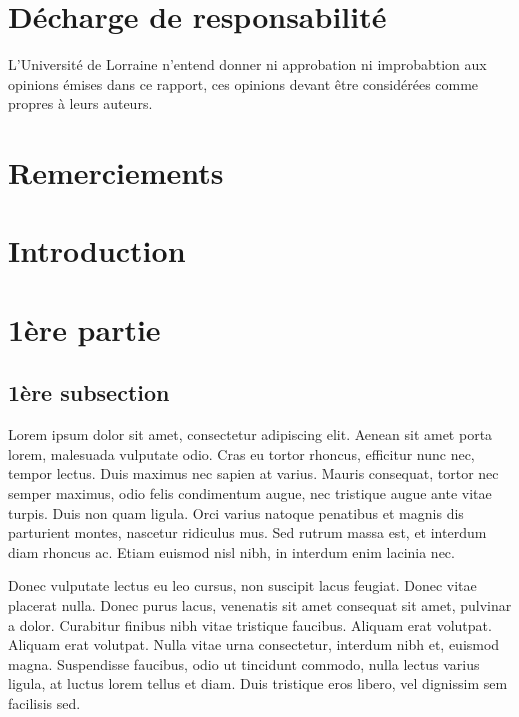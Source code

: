 \documentclass[11pt]{article}
\begin{document}
\newpage \newpage
\section*{Décharge de responsabilité }\bigbreak
L'Université de Lorraine n'entend donner ni approbation  ni improbabtion aux opinions émises dans ce rapport,
ces opinions devant être considérées comme propres à leurs auteurs. \bigbreak

\newpage
\section*{Remerciements}


\newpage
\tableofcontents
\newpage

\setcounter{page}{1}
\section*{Introduction}



\section{1ère partie}
\subsection{1ère subsection}
Lorem ipsum dolor sit amet, consectetur adipiscing elit. Aenean sit amet porta 
lorem, malesuada vulputate odio. Cras eu tortor rhoncus, efficitur nunc nec, 
tempor lectus. Duis maximus nec sapien at varius. Mauris consequat, tortor nec 
semper maximus, odio felis condimentum augue, 
nec tristique augue ante vitae turpis. Duis non quam ligula. Orci varius natoque 
penatibus et magnis dis parturient montes, nascetur ridiculus mus. Sed rutrum 
massa est, et interdum diam rhoncus ac. Etiam euismod nisl nibh, in interdum enim 
lacinia nec. \bigbreak

Donec vulputate lectus eu leo cursus, non suscipit lacus feugiat. Donec vitae 
placerat nulla. Donec purus lacus, venenatis sit amet consequat sit amet, pulvinar
 a dolor. Curabitur finibus nibh vitae tristique faucibus. Aliquam erat volutpat. 
 Aliquam erat volutpat. Nulla vitae urna consectetur, interdum nibh et, euismod 
 magna. Suspendisse faucibus, odio ut tincidunt commodo, nulla lectus varius 
 ligula, at luctus lorem tellus et diam. Duis tristique eros libero, vel 
 dignissim sem facilisis sed. 
\end{document}
